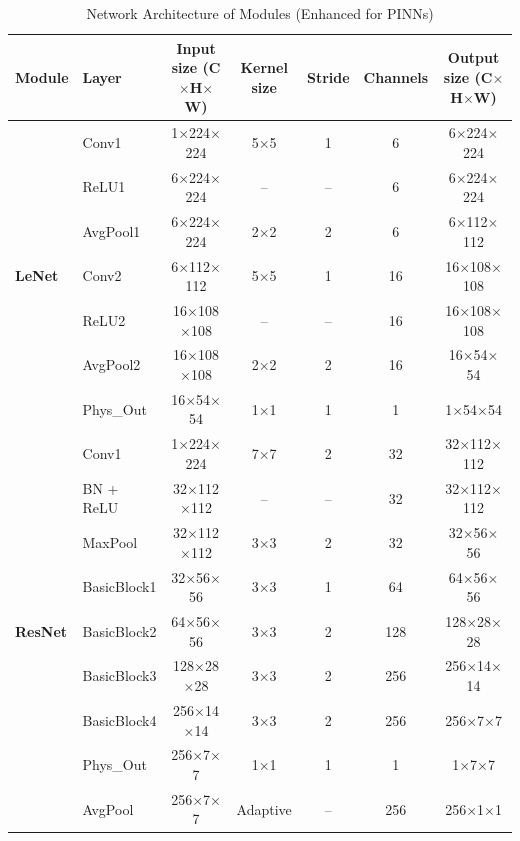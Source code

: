 \documentclass[final,5p,times,twocolumn]{elsarticle}
\begin{document}
\begin{table}[htbp]
	\centering
	\caption{Network Architecture of Modules (Enhanced for PINNs)}
	\label{tab1}
	\begin{tabular}{@{}llccccc@{}}
		\toprule
		
		\textbf{Module} & \textbf{Layer} & \textbf{Input size (C$\times$H$\times$W)} & \textbf{Kernel size} &  \textbf{Stride} & \textbf{Channels} & \textbf{Output size (C$\times$H$\times$W)} \\
		\midrule
		
		\multirow{7}{*}{\textbf{LeNet}} 
		&Conv1        & 1$\times$224$\times$224 & 5$\times$5 & 1  & 6   & 6$\times$224$\times$224 \\
		&ReLU1         & 6$\times$224$\times$224  & --          & --     & 6        & 6$\times$224$\times$224 \\
		&AvgPool1      & 6$\times$224$\times$224  & 2$\times$2  & 2      & 6        & 6$\times$112$\times$112 \\
		&Conv2         & 6$\times$112$\times$112  & 5$\times$5  & 1      & 16       & 16$\times$108$\times$108 \\
		&ReLU2         & 16$\times$108$\times$108 & --          & --     & 16       & 16$\times$108$\times$108 \\
		&AvgPool2      & 16$\times$108$\times$108 & 2$\times$2  & 2      & 16       & 16$\times$54$\times$54 \\
		&Phys\_Out     & 16$\times$54$\times$54   & 1$\times$1  & 1      & 1        & 1$\times$54$\times$54 \\
		\midrule
		
		\multirow{9}{*}{\textbf{ResNet}} 
		&Conv1         & 1$\times$224$\times$224  & 7$\times$7  & 2      & 32            & 32$\times$112$\times$112 \\
		&BN + ReLU     & 32$\times$112$\times$112 & --          & --     & 32            & 32$\times$112$\times$112 \\
		&MaxPool       & 32$\times$112$\times$112 & 3$\times$3  & 2      & 32            & 32$\times$56$\times$56 \\
		&BasicBlock1   & 32$\times$56$\times$56   & 3$\times$3  & 1      & 64 & 64$\times$56$\times$56 \\
		&BasicBlock2   & 64$\times$56$\times$56   & 3$\times$3  & 2      & 128 & 128$\times$28$\times$28 \\
		&BasicBlock3   & 128$\times$28$\times$28  & 3$\times$3  & 2      & 256 & 256$\times$14$\times$14 \\
		&BasicBlock4   & 256$\times$14$\times$14  & 3$\times$3  & 2      & 256            & 256$\times$7$\times$7 \\
		&Phys\_Out     & 256$\times$7$\times$7    & 1$\times$1  & 1      & 1              & 1$\times$7$\times$7 \\
		&AvgPool       & 256$\times$7$\times$7    & Adaptive    & --     & 256            & 256$\times$1$\times$1 \\
		\midrule
		

\end{tabular}
\end{table}
\end{document}
